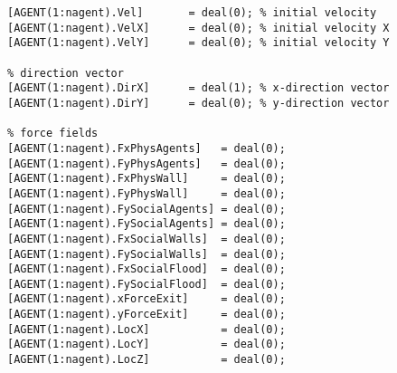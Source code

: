 \begin{lstlisting}[breaklines]
% agent velocity
[AGENT(1:nagent).Vel]       = deal(0); % initial velocity
[AGENT(1:nagent).VelX]      = deal(0); % initial velocity X
[AGENT(1:nagent).VelY]      = deal(0); % initial velocity Y

% direction vector
[AGENT(1:nagent).DirX]      = deal(1); % x-direction vector
[AGENT(1:nagent).DirY]      = deal(0); % y-direction vector

% force fields
[AGENT(1:nagent).FxPhysAgents]   = deal(0);
[AGENT(1:nagent).FyPhysAgents]   = deal(0);
[AGENT(1:nagent).FxPhysWall]     = deal(0);
[AGENT(1:nagent).FyPhysWall]     = deal(0);
[AGENT(1:nagent).FySocialAgents] = deal(0);
[AGENT(1:nagent).FySocialAgents] = deal(0);
[AGENT(1:nagent).FxSocialWalls]  = deal(0);
[AGENT(1:nagent).FySocialWalls]  = deal(0);
[AGENT(1:nagent).FxSocialFlood]  = deal(0);
[AGENT(1:nagent).FySocialFlood]  = deal(0);
[AGENT(1:nagent).xForceExit]     = deal(0);
[AGENT(1:nagent).yForceExit]     = deal(0);
[AGENT(1:nagent).LocX]           = deal(0);
[AGENT(1:nagent).LocY]           = deal(0);
[AGENT(1:nagent).LocZ]           = deal(0);


\end{lstlisting}
    
